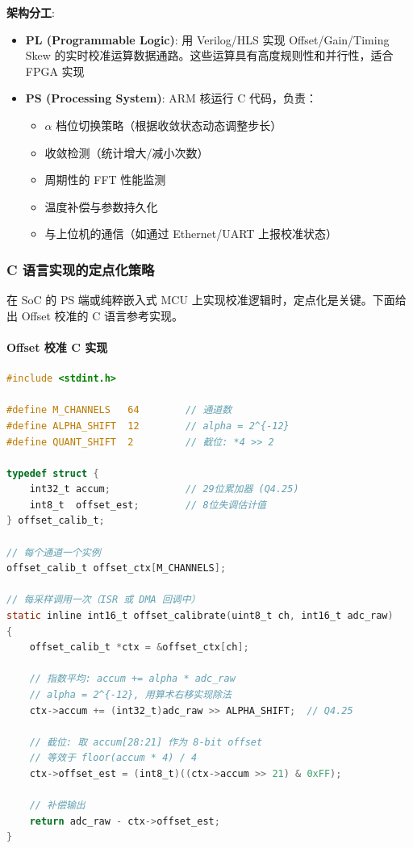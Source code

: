 \documentclass[UTF8,a4paper,11pt]{ctexart}
\begin{document}
\textbf{架构分工}:
\begin{itemize}
    \item \textbf{PL (Programmable Logic)}: 用 Verilog/HLS 实现 Offset/Gain/Timing Skew 的实时校准运算数据通路。这些运算具有高度规则性和并行性，适合 FPGA 实现
    \item \textbf{PS (Processing System)}: ARM 核运行 C 代码，负责：
    \begin{itemize}
        \item $\alpha$ 档位切换策略（根据收敛状态动态调整步长）
        \item 收敛检测（统计增大/减小次数）
        \item 周期性的 FFT 性能监测
        \item 温度补偿与参数持久化
        \item 与上位机的通信（如通过 Ethernet/UART 上报校准状态）
    \end{itemize}
\end{itemize}

\subsubsection{C 语言实现的定点化策略}

在 SoC 的 PS 端或纯粹嵌入式 MCU 上实现校准逻辑时，定点化是关键。下面给出 Offset 校准的 C 语言参考实现。

\paragraph{Offset 校准 C 实现}

\begin{lstlisting}[language=C, caption={Offset校准：C语言定点实现}]
#include <stdint.h>

#define M_CHANNELS   64        // 通道数
#define ALPHA_SHIFT  12        // alpha = 2^{-12}
#define QUANT_SHIFT  2         // 截位: *4 >> 2

typedef struct {
    int32_t accum;             // 29位累加器 (Q4.25)
    int8_t  offset_est;        // 8位失调估计值
} offset_calib_t;

// 每个通道一个实例
offset_calib_t offset_ctx[M_CHANNELS];

// 每采样调用一次（ISR 或 DMA 回调中）
static inline int16_t offset_calibrate(uint8_t ch, int16_t adc_raw)
{
    offset_calib_t *ctx = &offset_ctx[ch];
    
    // 指数平均: accum += alpha * adc_raw
    // alpha = 2^{-12}, 用算术右移实现除法
    ctx->accum += (int32_t)adc_raw >> ALPHA_SHIFT;  // Q4.25
    
    // 截位: 取 accum[28:21] 作为 8-bit offset
    // 等效于 floor(accum * 4) / 4
    ctx->offset_est = (int8_t)((ctx->accum >> 21) & 0xFF);
    
    // 补偿输出
    return adc_raw - ctx->offset_est;
}
\end{lstlisting}
\end{document}
